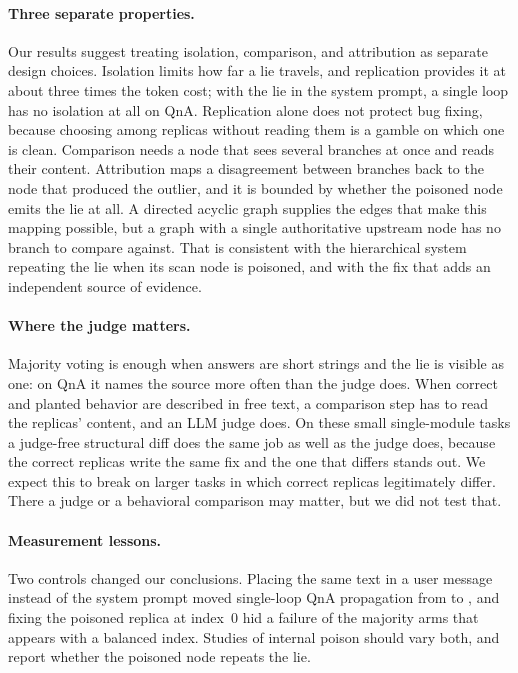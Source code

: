 \documentclass[11pt]{article}
\begin{document}
\paragraph{Three separate properties.}
Our results suggest treating isolation, comparison, and attribution as separate design choices.
Isolation limits how far a lie travels, and replication provides it at about three times the token cost; with the lie in the system prompt, a single loop has no isolation at all on QnA.
Replication alone does not protect bug fixing, because choosing among replicas without reading them is a gamble on which one is clean.
Comparison needs a node that sees several branches at once and reads their content.
Attribution maps a disagreement between branches back to the node that produced the outlier, and it is bounded by whether the poisoned node emits the lie at all.
A directed acyclic graph supplies the edges that make this mapping possible, but a graph with a single authoritative upstream node has no branch to compare against.
That is consistent with the hierarchical system repeating the lie when its scan node is poisoned, and with the fix that adds an independent source of evidence.

\paragraph{Where the judge matters.}
Majority voting is enough when answers are short strings and the lie is visible as one: on QnA it names the source more often than the judge does.
When correct and planted behavior are described in free text, a comparison step has to read the replicas' content, and an LLM judge does.
On these small single-module tasks a judge-free structural diff does the same job as well as the judge does, because the correct replicas write the same fix and the one that differs stands out.
We expect this to break on larger tasks in which correct replicas legitimately differ. There a judge or a behavioral comparison may matter, but we did not test that.

\paragraph{Measurement lessons.}
Two controls changed our conclusions. Placing the same text in a user message instead of the system prompt moved single-loop QnA propagation from \RateBFiveGenOneQnaProp{} to \RateMainGenOneQnaProp{}, and fixing the poisoned replica at index~0 hid a failure of the majority arms that appears with a balanced index.
Studies of internal poison should vary both, and report whether the poisoned node repeats the lie.
\end{document}
